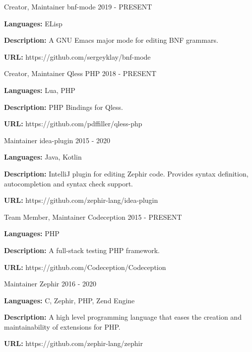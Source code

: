 \begin{cventries}
  \cventry
    {Creator, Maintainer}
    {bnf-mode}
    {}
    {2019 - PRESENT}
    {
      \begin{cvitems}
        \item {\textbf{Languages:} ELisp}
        \item {\textbf{Description:} A GNU Emacs major mode for editing BNF grammars.}
        \item {\textbf{URL:} https://github.com/sergeyklay/bnf-mode}
      \end{cvitems}
    }

    \cventry
    {Creator, Maintainer}
    {Qless PHP}
    {}
    {2018 - PRESENT}
    {
      \begin{cvitems}
        \item {\textbf{Languages:} Lua, PHP}
        \item {\textbf{Description:} PHP Bindings for Qless.}
        \item {\textbf{URL:} https://github.com/pdffiller/qless-php}
      \end{cvitems}
    }

  \cventry
    {Maintainer}
    {idea-plugin}
    {}
    {2015 - 2020}
    {
      \begin{cvitems}
        \item {\textbf{Languages:} Java, Kotlin}
        \item {\textbf{Description:} IntelliJ plugin for editing Zephir code. Provides syntax definition, autocompletion and syntax check support.}
        \item {\textbf{URL:} https://github.com/zephir-lang/idea-plugin}
      \end{cvitems}
    }

  \cventry
    {Team Member, Maintainer}
    {Codeception}
    {}
    {2015 - PRESENT}
    {
      \begin{cvitems}
        \item {\textbf{Languages:} PHP}
        \item {\textbf{Description:} A full-stack testing PHP framework.}
        \item {\textbf{URL:} https://github.com/Codeception/Codeception}
      \end{cvitems}
    }

  \cventry
    {Maintainer}
    {Zephir}
    {}
    {2016 - 2020}
    {
      \begin{cvitems}
        \item {\textbf{Languages:} C, Zephir, PHP, Zend Engine}
        \item {\textbf{Description:} A high level programming language that eases the creation and maintainability of extensions for PHP.}
        \item {\textbf{URL:} https://github.com/zephir-lang/zephir}
      \end{cvitems}
    }


\end{cventries}
